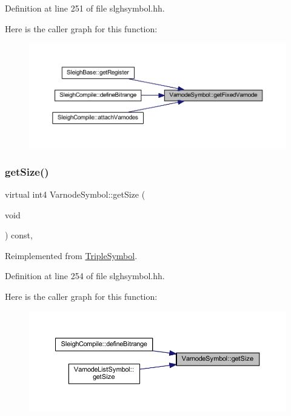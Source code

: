 Definition at line 251 of file slghsymbol.\+hh.

Here is the caller graph for this function\+:
\nopagebreak
\begin{figure}[H]
\begin{center}
\leavevmode
\includegraphics[width=350pt]{class_varnode_symbol_a4552dee5d466cadd34766d38fd804c8e_icgraph}
\end{center}
\end{figure}
\mbox{\label{class_varnode_symbol_a3e37b8884d830c54656a43e6b2e1712b}} 
\subsubsection{\texorpdfstring{getSize()}{getSize()}}
{\footnotesize\ttfamily virtual int4 Varnode\+Symbol\+::get\+Size (\begin{DoxyParamCaption}\item[{void}]{ }\end{DoxyParamCaption}) const\hspace{0.3cm}{\ttfamily [inline]}, {\ttfamily [virtual]}}



Reimplemented from \mbox{\hyperlink{class_triple_symbol_a7351de4a1db140381d0b7913a8c613fd}{Triple\+Symbol}}.



Definition at line 254 of file slghsymbol.\+hh.

Here is the caller graph for this function\+:
\nopagebreak
\begin{figure}[H]
\begin{center}
\leavevmode
\includegraphics[width=350pt]{class_varnode_symbol_a3e37b8884d830c54656a43e6b2e1712b_icgraph}
\end{center}
\end{figure}
\mbox{\label{class_varnode_symbol_a15662a0fcf1825811b7729bee1a5a2a5}} 

